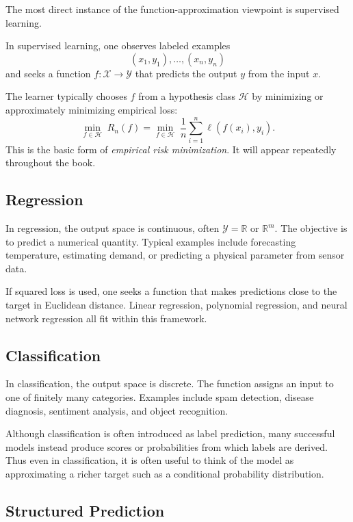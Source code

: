 The most direct instance of the function-approximation viewpoint is supervised learning.

\begin{definition}
In supervised learning, one observes labeled examples
\[
(x_1,y_1),\dots,(x_n,y_n)
\]
and seeks a function $f:\mathcal{X}\to\mathcal{Y}$ that predicts the output $y$ from the input $x$.
\end{definition}

The learner typically chooses $f$ from a hypothesis class $\mathcal{H}$ by minimizing or approximately minimizing empirical loss:
\[
\min_{f \in \mathcal{H}} \; \widehat{R}_n(f)
=
\min_{f \in \mathcal{H}} \; \frac{1}{n}\sum_{i=1}^n \ell(f(x_i),y_i).
\]
This is the basic form of \emph{empirical risk minimization}. It will appear repeatedly throughout the book.

\subsection{Regression}

In regression, the output space is continuous, often $\mathcal{Y}=\mathbb{R}$ or $\mathbb{R}^m$. The objective is to predict a numerical quantity. Typical examples include forecasting temperature, estimating demand, or predicting a physical parameter from sensor data.

If squared loss is used, one seeks a function that makes predictions close to the target in Euclidean distance. Linear regression, polynomial regression, and neural network regression all fit within this framework.

\subsection{Classification}

In classification, the output space is discrete. The function assigns an input to one of finitely many categories. Examples include spam detection, disease diagnosis, sentiment analysis, and object recognition.

Although classification is often introduced as label prediction, many successful models instead produce scores or probabilities from which labels are derived. Thus even in classification, it is often useful to think of the model as approximating a richer target such as a conditional probability distribution.

\subsection{Structured Prediction}

